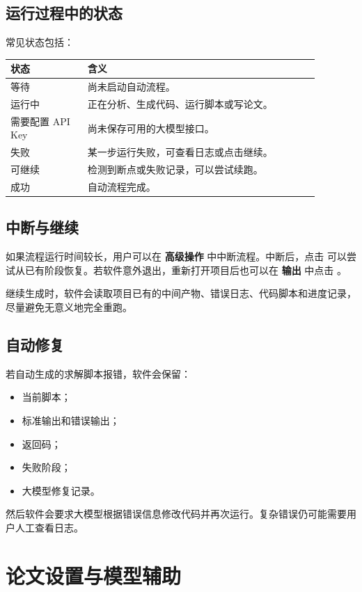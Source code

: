 \documentclass[UTF8,a4paper,12pt]{ctexart}
\newcommand{\button}[1]{\fbox{\textsf{#1}}}
\newcommand{\menu}[1]{\textbf{#1}}
\begin{document}
\subsection{运行过程中的状态}

常见状态包括：

\begin{longtable}{p{0.22\linewidth}p{0.66\linewidth}}
\toprule
状态 & 含义 \\
\midrule
等待 & 尚未启动自动流程。 \\
运行中 & 正在分析、生成代码、运行脚本或写论文。 \\
需要配置 API Key & 尚未保存可用的大模型接口。 \\
失败 & 某一步运行失败，可查看日志或点击继续。 \\
可继续 & 检测到断点或失败记录，可以尝试续跑。 \\
成功 & 自动流程完成。 \\
\bottomrule
\end{longtable}

\subsection{中断与继续}

如果流程运行时间较长，用户可以在 \menu{高级操作} 中中断流程。中断后，点击 \button{继续} 可以尝试从已有阶段恢复。若软件意外退出，重新打开项目后也可以在 \menu{输出} 中点击 \button{继续}。

继续生成时，软件会读取项目已有的中间产物、错误日志、代码脚本和进度记录，尽量避免无意义地完全重跑。

\subsection{自动修复}

若自动生成的求解脚本报错，软件会保留：

\begin{itemize}
  \item 当前脚本；
  \item 标准输出和错误输出；
  \item 返回码；
  \item 失败阶段；
  \item 大模型修复记录。
\end{itemize}

然后软件会要求大模型根据错误信息修改代码并再次运行。复杂错误仍可能需要用户人工查看日志。

\section{论文设置与模型辅助}
\end{document}
